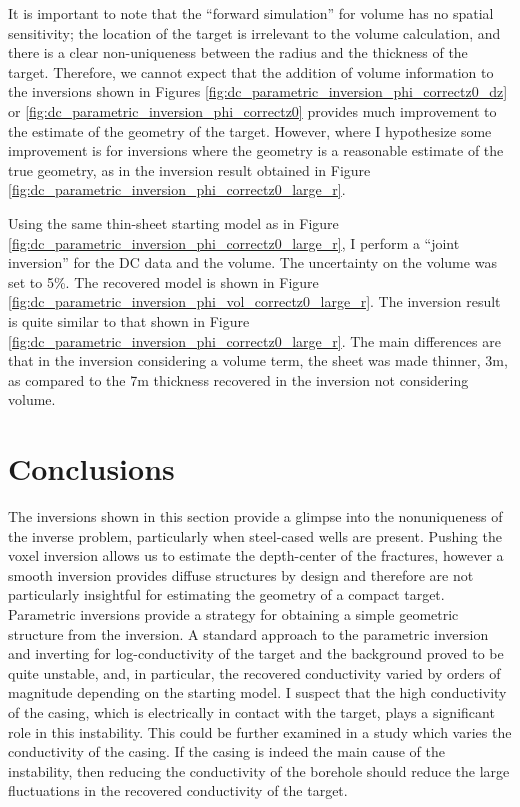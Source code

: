 It is important to note that the ``forward simulation'' for volume has no spatial sensitivity; the location of the target is irrelevant to the volume calculation, and there is a clear non-uniqueness between the radius and the thickness of the target. Therefore, we cannot expect that the addition of volume information to the inversions shown in Figures \ref{fig:dc_parametric_inversion_phi_correctz0_dz} or \ref{fig:dc_parametric_inversion_phi_correctz0} provides much improvement to the estimate of the geometry of the target. However, where I hypothesize some improvement is for inversions where the geometry is a reasonable estimate of the true geometry, as in the inversion result obtained in Figure \ref{fig:dc_parametric_inversion_phi_correctz0_large_r}.

Using the same thin-sheet starting model as in Figure \ref{fig:dc_parametric_inversion_phi_correctz0_large_r}, I perform a ``joint inversion'' for the DC data and the volume. The uncertainty on the volume was set to 5\%. The recovered model is shown in Figure \ref{fig:dc_parametric_inversion_phi_vol_correctz0_large_r}. The inversion result is quite similar to that shown in Figure \ref{fig:dc_parametric_inversion_phi_correctz0_large_r}. The main differences are that in the inversion considering a volume term, the sheet was made thinner, 3m, as compared to the 7m thickness recovered in the inversion not considering volume.




\section{Conclusions}
The inversions shown in this section provide a glimpse into the nonuniqueness of the inverse problem, particularly when steel-cased wells are present. Pushing the voxel inversion allows us to estimate the depth-center of the fractures, however a smooth inversion provides diffuse structures by design and therefore are not particularly insightful for estimating the geometry of a compact target. Parametric inversions provide a strategy for obtaining a simple geometric structure from the inversion. A standard approach to the parametric inversion and inverting for log-conductivity of the target and the background proved to be quite unstable, and, in particular, the recovered conductivity varied by orders of magnitude depending on the starting model. I suspect that the high conductivity of the casing, which is electrically in contact with the target, plays a significant role in this instability. This could be further examined in a study which varies the conductivity of the casing. If the casing is indeed the main cause of the instability, then reducing the conductivity of the borehole should reduce the large fluctuations in the recovered conductivity of the target.


